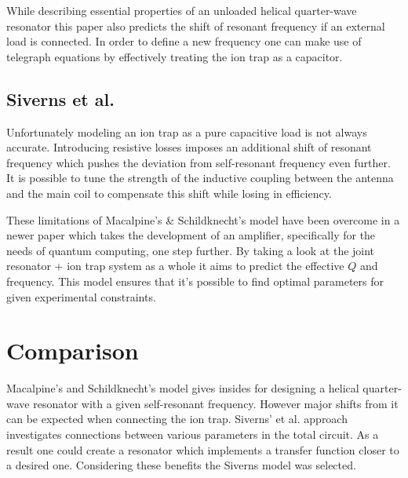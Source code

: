 While describing essential properties of an unloaded helical quarter-wave resonator this paper \cite{Macalpine2000} also predicts the shift of resonant frequency if an external load is connected. In order to define a new frequency one can make use of telegraph equations \cite{Rohde2009} by effectively treating the ion trap as a capacitor.

\subsection{Siverns et al.}
Unfortunately modeling an ion trap as a pure capacitive load is not always accurate. Introducing resistive losses imposes an additional shift of resonant frequency which pushes the deviation from self-resonant frequency even further. It is possible to tune the strength of the inductive coupling between the antenna and the main coil to compensate this shift while losing in efficiency.

These limitations of Macalpine's \& Schildknecht's \cite{Macalpine2000} model have been overcome in a newer paper \cite{Siverns2012} which takes the development of an amplifier, specifically for the needs of quantum computing, one step further. By taking a look at the joint resonator + ion trap system as a whole it aims to predict the effective $Q$ and frequency. This model ensures that it's possible to find optimal parameters for given experimental constraints.

\section{Comparison}
Macalpine's and Schildknecht's \cite{Macalpine2000} model gives insides for designing a helical quarter-wave resonator with a given self-resonant frequency. However major shifts from it can be expected when connecting the ion trap. Siverns' et al. approach \cite{Siverns2012} investigates connections between various parameters in the total circuit. As a result one could create a resonator which implements a transfer function closer to a desired one. Considering these benefits the Siverns model \cite{Siverns2012} was selected.